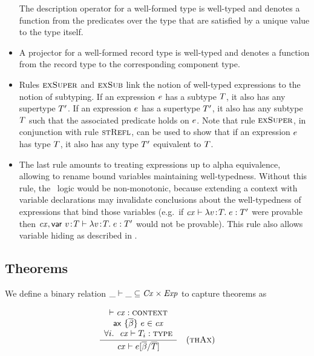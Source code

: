 \begin{itemize}
The description operator for a well-formed type is well-typed and denotes a
function from the predicates over the type that are satisfied by a unique
value to the type itself.
\item
A projector for a well-formed record type is well-typed and denotes a function
from the record type to the corresponding component type.
\item
Rules $\textsc{exSuper}$ and $\textsc{exSub}$ link the notion of well-typed expressions to the
notion of subtyping. If an expression $e$ has a subtype $T$, it also
has any supertype $T'$. If an expression $e$ has a supertype $T'$,
it also has any subtype $T$ such that the associated predicate holds on
$e$. Note that rule $\textsc{exSuper}$, in conjunction with rule $\textsc{stRefl}$, can
be used to show that if an expression $e$ has type $T$, it also has any
type $T'$ equivalent to $T$.
\item
The last rule amounts to treating expressions up to alpha equivalence,
allowing to rename bound variables maintaining well-typedness. Without this
rule, the \MS\ logic would be non-monotonic, because extending a context with
variable declarations may invalidate conclusions about the well-typedness of
expressions that bind those variables (e.g.\ if $\mathit{cx}\vdash\lambda v\!:\!T.\;e:T'$ were
provable then $\mathit{cx},\mathsf{var}\ v\!:\!T\vdash\lambda v\!:\!T.\;e:T'$ would not be
provable). This rule also allows variable hiding as described in \cite{lm}.
\end{itemize}

\subsection{Theorems}

We define a binary relation $\_\vdash\_\subseteq\mathit{Cx}\times\mathit{Exp}$ to capture theorems
as

\[
\frac{\begin{array}{c}\vdash\mathit{cx}:\textsc{context}\\\mathsf{ax}\ \{\overline{\beta}\}\ e\in\mathit{cx}\\\forall i.\ \ \mathit{cx}\vdash T_i:\textsc{type}\end{array}}{\mathit{cx}\vdash e[\overline{\beta}/\overline{T}]}\quad\mbox{(\textsc{thAx})}
\]

